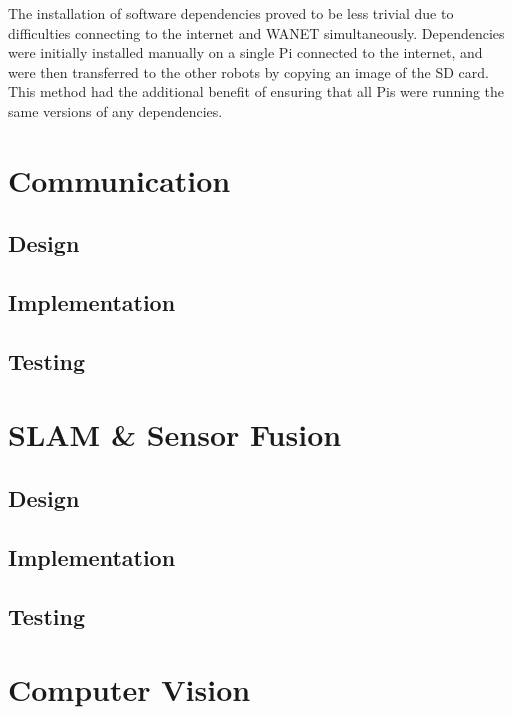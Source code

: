 The installation of software dependencies proved to be less trivial due to difficulties connecting to the internet and WANET simultaneously. Dependencies were initially installed manually on a single Pi connected to the internet, and were then transferred to the other robots by copying an image of the SD card. This method had the additional benefit of ensuring that all Pis were running the same versions of any dependencies.


\section{Communication}\label{soft/comms}

\subsection{Design}\label{soft/comms/design}

\subsection{Implementation}\label{soft/comms/impl}

\subsection{Testing}\label{soft/comms/test}




\section{SLAM \& Sensor Fusion}\label{soft/SLAM}

\subsection{Design}\label{soft/SLAM/design}

\subsection{Implementation}\label{soft/SLAM/impl}

\subsection{Testing}\label{soft/SLAM/test}



\section{Computer Vision}\label{soft/cv}

